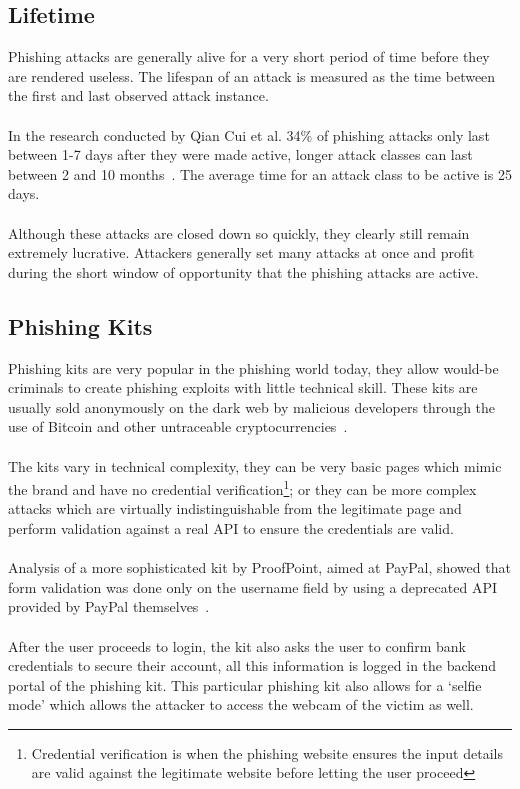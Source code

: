 \documentclass[12pt,twoside]{report}
\begin{document}
\subsection{Lifetime}
Phishing attacks are generally alive for a very short period of time before they are rendered useless. The lifespan of an attack is measured as the time between the first and last observed attack instance.
\\\\
In the research conducted by Qian Cui et al. 34\% of phishing attacks only last between 1-7 days after they were made active, longer attack classes can last between 2 and 10 months~\cite{phishingovertime}. The average time for an attack class to be active is 25 days.
\\\\
Although these attacks are closed down so quickly, they clearly still remain extremely lucrative. Attackers generally set many attacks at once and profit during the short window of opportunity that the phishing attacks are active.
\subsection{Phishing Kits}
Phishing kits are very popular in the phishing world today, they allow would-be criminals to create phishing exploits with little technical skill. These kits are usually sold anonymously on the dark web by malicious developers through the use of Bitcoin and other untraceable cryptocurrencies~\cite{bitcoin}.
\\\\
The kits vary in technical complexity, they can be very basic pages which mimic the brand and have no credential verification\footnote{Credential verification is when the phishing website ensures the input details are valid against the legitimate website before letting the user proceed}; or they can be more complex attacks which are virtually indistinguishable from the legitimate page and perform validation against a real API to ensure the credentials are valid.
\\\\
Analysis of a more sophisticated kit by ProofPoint, aimed at PayPal, showed that form validation was done only on the username field by using a deprecated API provided by PayPal themselves~\cite{proofpoint}.
\\\\
After the user proceeds to login, the kit also asks the user to confirm bank credentials to secure their account, all this information is logged in the backend portal of the phishing kit. This particular phishing kit also allows for a `selfie mode' which allows the attacker to access the webcam of the victim as well.
\end{document}
